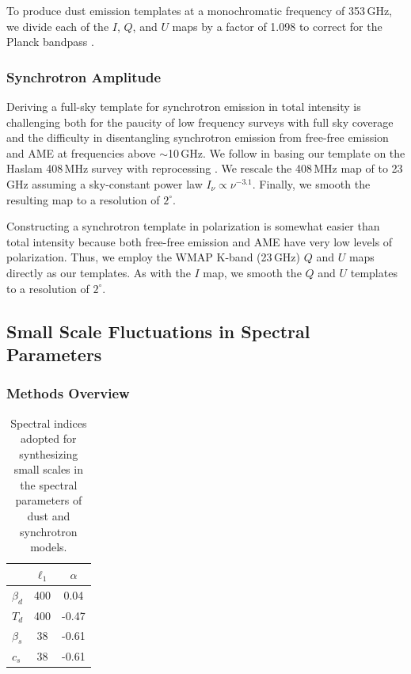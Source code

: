 \documentclass[twocolumn]{aastex631}
\begin{document}
To produce dust emission templates at a monochromatic frequency of 353\,GHz, we divide each of the $I$, $Q$, and $U$ maps by a factor of 1.098 to correct for the Planck bandpass \citep[][Table~2]{planck2016-l11A}.

\subsubsection{Synchrotron Amplitude}
Deriving a full-sky template for synchrotron emission in total intensity is challenging both for the paucity of low frequency surveys with full sky coverage and the difficulty in disentangling synchrotron emission from free-free emission and AME at frequencies above $\sim$10\,GHz. We follow \citet{Thorne:2017} in basing our template on the Haslam 408\,MHz survey with reprocessing \citep{Remazeilles:2015}. We rescale the 408\,MHz map of \cite{Remazeilles:2015} to 23\,GHz assuming a sky-constant power law $I_\nu \propto \nu^{-3.1}$. Finally, we smooth the resulting map to a resolution of $2^\circ$.

Constructing a synchrotron template in polarization is somewhat easier than total intensity because both free-free emission and AME have very low levels of polarization. Thus, we employ the WMAP K-band (23\,GHz) $Q$ and $U$ maps directly as our templates. As with the $I$ map, we smooth the $Q$ and $U$ templates to a resolution of $2^\circ$.


\subsection{Small Scale Fluctuations in Spectral Parameters} \label{sec:spec_params}

\subsubsection{Methods Overview}
\begin{table}
    \centering
    \begin{tabular}{lcc}
    \toprule 
   &   $ \ell_1   $    &$\alpha$  \\
   \midrule  
   $\beta_d$ & 400 & 0.04 \\ 
   $T_d$  &  400  & -0.47\\
    \midrule 
    $\beta_s$ & 38 & -0.61\\
    $c_s$ & 38 &  -0.61  \\ 
   \bottomrule
    \end{tabular}
    \caption{Spectral indices adopted for synthesizing  small scales in the spectral parameters of dust and synchrotron models. }
    \label{tab:smallscale_specpar}
\end{table}
\end{document}
